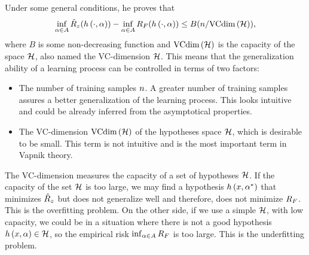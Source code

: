 Under some general conditions, he proves that
\begin{equation}\label{eq:ordinary_generalization_bound}
    \inf_{\param \in \paramspace} \emprisk(\hyp{\cdot}{\param}) - \inf_{\param \in \paramspace} \exprisk(\hyp{\cdot}{\param}) \leq B(\nsamples/\vcdim{\hypspace}) ,
\end{equation}
where $B$ is some non-decreasing function and $\text{VCdim}\left(\mathcal{H}\right)$ is the capacity of the space $\mathcal{H}$, also named the VC-dimension $\mathcal{H}$. This means that the generalization ability of a learning process can be controlled in terms of two factors:
\begin{itemize}
    \item The number of training samples $n$. A greater number of training samples assures a better generalization of the learning process. This looks intuitive and could be already inferred from the asymptotical properties. 
    \item The VC-dimension $\text{VCdim}\left(\mathcal{H}\right)$ of the hypotheses space $\mathcal{H}$, which is desirable to be small. This term is not intuitive and is the most important term in Vapnik theory.
\end{itemize}
The VC-dimension measures the capacity of a set of hypotheses $\mathcal{H}$. 
If the capacity of the set $\mathcal{H}$ is too large, we may find a
hypothesis $h\left(x, {\alpha}^*\right)$ that minimizes $\hat{R}_z$ but does not 
generalize well and therefore, does not minimize $R_F$. This is the 
overfitting problem. 
On the other side, if we use a simple $\mathcal{H}$, 
with low capacity, we could be in a situation where there is not a good hypothesis $h\left(x, \alpha\right) \in \mathcal{H}$, so the empirical risk $\inf_{\alpha \in A} R_F$ is too large. This is the underfitting problem.


